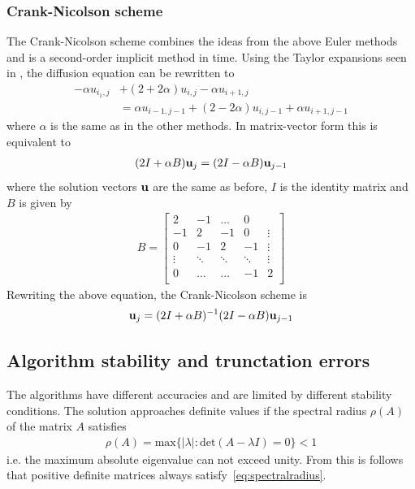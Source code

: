 \documentclass[aps,reprint]{revtex4-1}
\begin{document}
\subsubsection{Crank-Nicolson scheme}
The Crank-Nicolson scheme combines the ideas from the above Euler methods and is
a second-order implicit method in time. Using the Taylor expansions seen in
\cite{mortenjensen}, the diffusion equation can be rewritten to
\begin{align*}
  -\alpha u_{i_1, j} &+ (2 + 2\alpha) u_{i,j} - \alpha u_{i+1,j}\\
   &= \alpha u_{i-1,j-1} + (2 - 2\alpha) u_{i, j-1} + \alpha u_{i+1,j-1}
\end{align*}
where $\alpha$ is the same as in the other methods. In matrix-vector form this
is equivalent to
\begin{align*}
  (2 I + \alpha B) \vb{u}_j = (2 I - \alpha B) \vb{u}_{j-1}
\end{align*}
where the solution vectors $\vb{u}$ are the same as before, $I$ is the identity
matrix and $B$ is given by
\begin{align*}
  B = \begin{bmatrix}
        2  & -1 & \hdots  & 0      \\
        -1 & 2  & -1 & 0       & \vdots \\
        0  & -1 & 2  & -1  & \vdots \\
        \vdots       & \ddots      & \ddots       & \ddots  & \vdots \\
        0  & \hdots  & \hdots       & -1  & 2 \\
      \end{bmatrix}
\end{align*}
Rewriting the above equation, the Crank-Nicolson scheme is
\begin{align*}
  \vb{u}_j = (2 I + \alpha B)^{-1} (2 I - \alpha B) \vb{u}_{j-1}
\end{align*}
\subsection{Algorithm stability and trunctation errors}
The algorithms have different accuracies and are limited by different stability
conditions. The solution approaches definite values if the spectral radius $\rho(A)$ of
the matrix $A$ satisfies
\begin{align} \label{eq:spectralradius}
  \rho(A) = \text{max}\{ |\lambda| : \text{det}(A - \lambda I) = 0 \} < 1
\end{align}
i.e. the maximum absolute eigenvalue can not exceed unity. From this is follows
that positive definite matrices always satisfy~\ref{eq:spectralradius}.
\end{document}
